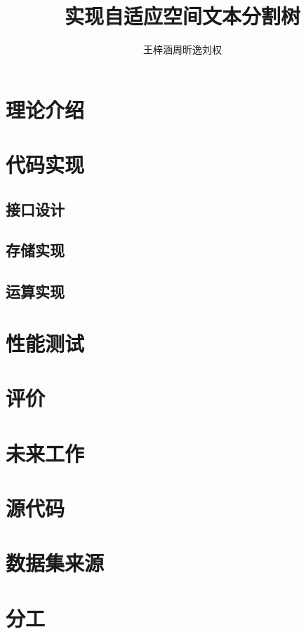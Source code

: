 \documentclass[UTF8]{ctexart}
\title{实现自适应空间文本分割树}
\author{王梓涵\quad 周昕逸\quad 刘权}
\date{}
\begin{document}
\maketitle

\linespread{0.5}
\setlength{\parskip}{0.5\baselineskip}

\section{理论介绍}

\section{代码实现}

\subsection{接口设计}

\subsection{存储实现}

\subsection{运算实现}

\section{性能测试}

\section{评价}

\section{未来工作}

\newpage

\begin{appendices}

\section{源代码}

\section{数据集来源}

\section{分工}

\end{appendices}
\end{document}
